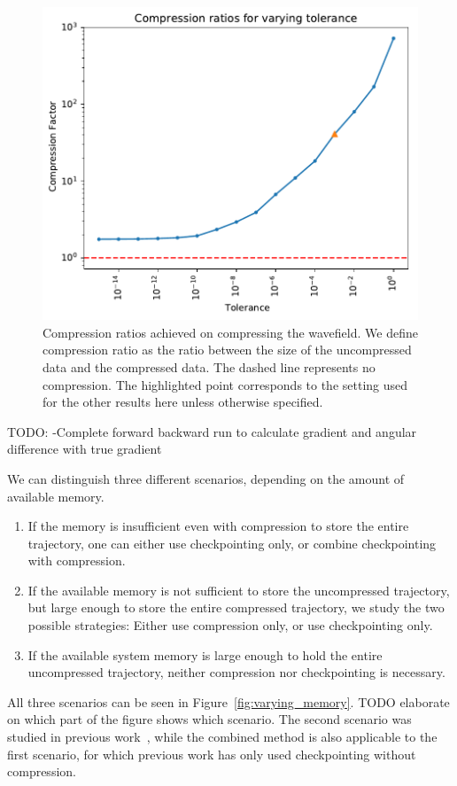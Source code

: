 \begin{figure}
\begin{center}
\includegraphics[width=0.9\linewidth]{images/tolerance-cf-richter.pdf}
\end{center}
\caption{Compression ratios achieved on compressing the wavefield. We
  define compression ratio as the ratio between the size of the
  uncompressed data and the compressed data. The dashed line
  represents no compression. The highlighted point corresponds to the
  setting used for the other results here unless otherwise specified.}
\label{fig:tolerance_cf_plot}
\end{figure}

TODO: -Complete forward backward run to calculate gradient and angular
difference with true gradient

We can distinguish three different scenarios, depending on the amount of
available memory.
\begin{enumerate}
\item If the memory is insufficient even with compression to store the entire
trajectory, one can either use checkpointing only, or combine checkpointing with
compression.
\item If the available memory is not sufficient to store the uncompressed
trajectory, but large enough to store the entire compressed trajectory, we study
the two possible strategies: Either use compression only, or use checkpointing
only.
\item If the available system memory is large enough to hold the entire
uncompressed trajectory, neither compression nor checkpointing is necessary.
\end{enumerate}
All three scenarios can be seen in
Figure~\ref{fig:varying_memory}. TODO elaborate on which part of the
figure shows which scenario. 
The second scenario was studied in previous work~\cite{cyr2015towards}, while
the combined method is also applicable to the first scenario, for which previous
work has only used checkpointing without compression.

